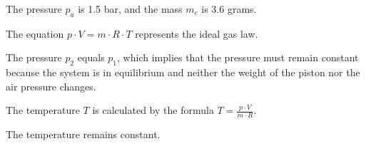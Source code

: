 The pressure \( p_a \) is 1.5 bar, and the mass \( m_c \) is 3.6 grams.

The equation \( p \cdot V = m \cdot R \cdot T \) represents the ideal gas law.

The pressure \( p_2 \) equals \( p_1 \), which implies that the pressure must remain constant because the system is in equilibrium and neither the weight of the piston nor the air pressure changes.

The temperature \( T \) is calculated by the formula \( T = \frac{p \cdot V}{m \cdot R} \).

The temperature remains constant.